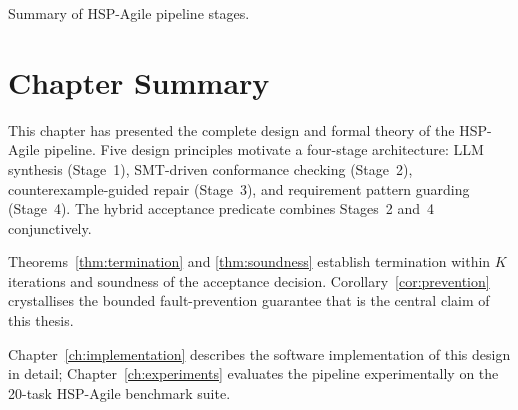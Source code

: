\begin{inlinetable}{Summary of HSP-Agile pipeline stages.}
  \label{tab:stage-summary}
\end{inlinetable}

\section*{Chapter Summary}

This chapter has presented the complete design and formal theory of the
HSP-Agile pipeline.  Five design principles motivate a four-stage architecture:
LLM synthesis (Stage~1), SMT-driven conformance checking (Stage~2),
counterexample-guided repair (Stage~3), and requirement pattern guarding
(Stage~4).  The hybrid acceptance predicate combines Stages~2 and~4
conjunctively.

Theorems~\ref{thm:termination} and \ref{thm:soundness} establish termination
within $K$ iterations and soundness of the acceptance decision.
Corollary~\ref{cor:prevention} crystallises the bounded fault-prevention
guarantee that is the central claim of this thesis.

Chapter~\ref{ch:implementation} describes the software implementation of
this design in detail; Chapter~\ref{ch:experiments} evaluates the pipeline
experimentally on the 20-task HSP-Agile benchmark suite.
